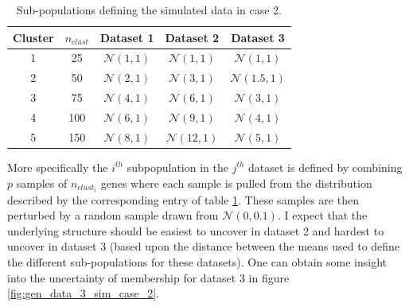\documentclass[14pt]{extarticle} %
\begin{document}
	\begin{table}[!htb] 
		\centering
		\begin{tabular}{c|c|ccc} 
			Cluster & $n_{clust}$	& Dataset 1	& Dataset 2	& Dataset 3	\\ 
			\hline
			1 		&	25 		& $\mathcal{N}(1,1)$	& $\mathcal{N}(1,1)$ 	& $\mathcal{N}(1,1)$	\\
			2 		&	50		& $\mathcal{N}(2,1)$	& $\mathcal{N}(3,1)$ 	& $\mathcal{N}(1.5,1)$	\\
			3 		& 	75		& $\mathcal{N}(4,1)$	& $\mathcal{N}(6,1)$ 	& $\mathcal{N}(3,1)$	\\
			4 		&	100		& $\mathcal{N}(6,1)$	& $\mathcal{N}(9,1)$ 	& $\mathcal{N}(4,1)$	\\
			5 		&	150 	& $\mathcal{N}(8,1)$	& $\mathcal{N}(12,1)$ 	& $\mathcal{N}(5,1)$	
		\end{tabular}
		\caption{Sub-populations defining the simulated data in case 2.}
		\label{table:generated_data_case_2}
	\end{table}
	
	More specifically the $i^{th}$ subpopulation in the $j^{th}$ dataset is defined by combining $p$ samples of $n_{clust_i}$ genes where each sample is pulled from the distribution described by the corresponding entry of table \ref{table:generated_data_case_2}. These samples are then perturbed by a random sample drawn from $\mathcal{N}(0,0.1)$. I expect that the underlying structure should be easiest to uncover in dataset 2 and hardest to uncover in dataset 3 (based upon the distance between the means used to define the different sub-populations for these datasets). One can obtain some insight into the uncertainty of membership for dataset 3 in figure \ref{fig:gen_data_3_sim_case_2}.
\end{document}
